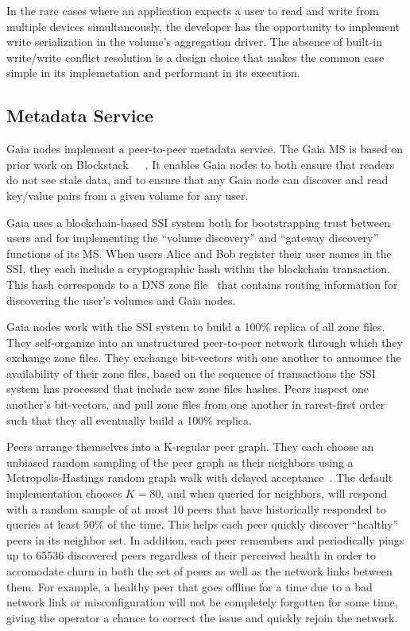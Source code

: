In the rare cases where an application expects a user to read and write from
multiple devices simultaneously, the developer has the opportunity to implement
write serialization in the volume's aggregation driver.  The absence of built-in
write/write conflict resolution is a design choice that makes the common case
simple in its implemetation and performant in its execution. 

\subsection{Metadata Service}

Gaia nodes implement a peer-to-peer metadata service.  The Gaia MS is based on prior work
on Blockstack~\cite{blockstack}~\cite{virtualchain}~\cite{ali2017}.  It enables
Gaia nodes to both ensure that readers do not see stale data, and to ensure that
any Gaia node can discover and read key/value pairs from a given volume for any user.

Gaia uses a blockchain-based SSI system both for bootstrapping trust between
users and for implementing the ``volume discovery'' and ``gateway discovery''
functions of its MS.  When users Alice and Bob 
register their user names in the SSI, they each include a cryptographic hash within the
blockchain transaction.  This hash corresponds to a DNS zone
file~\cite{rfc-zone-file} that contains routing information for discovering the
user's volumes and Gaia nodes.

Gaia nodes work with the SSI system to build a 100\% replica of all zone files.
They self-organize into an unstructured
peer-to-peer network through which they exchange zone files.  They exchange
bit-vectors with one another to announce the availability of their zone files,
based on the sequence of transactions the SSI system has processed that include
new zone files hashes.  Peers inspect one another's bit-vectors, and pull
zone files from one another in rarest-first order such that they all eventually
build a 100\% replica.

Peers arrange themselves into a K-regular peer graph.  They each choose an
unbiased random sampling of the peer graph as their neighbors using a
Metropolis-Hastings random graph walk with delayed acceptance~\cite{lee-xu-eun}.
The default implementation chooses $K=80$, and when queried for neighbors, will
respond with a random sample of at most 10 peers that
have historically responded to queries at least 50\% of the time.  This helps
each peer quickly discover ``healthy'' peers in its neighbor set.  In addition,
each peer remembers and periodically pings up to 65536 discovered
peers regardless of their perceived health in order to accomodate churn in both
the set of peers as well as the network links between them.  For example, a
healthy peer that goes offline for a time due to a bad network link or
misconfiguration will not be completely forgotten for some time, giving the
operator a chance to correct the issue and quickly rejoin the network.

